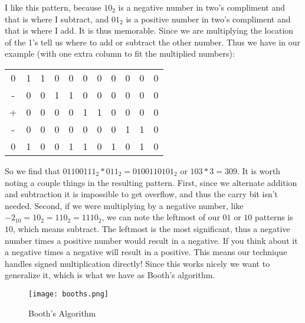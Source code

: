 I like this pattern, because $10_2$ is a negative number in two's compliment and that is where I subtract, and $01_2$ is a positive number in two's compliment and that is where I add.  It is thus memorable.  Since we are multiplying the location of the 1's tell us where to add or subtract the other number.  Thus we have in our example (with one extra column to fit the multiplied numbers):

\begin{tabular}{cccccccccc@{ . }c}
0 & {\color{blue}1}
      & {\color{blue}1}
          & 0 & 0 & 0 & 0 & 0 & 0 & 0 & 0\\
- & 0 & 0 & {\color{red}1}
              & {\color{red}1}
                  & 0 & 0 & 0 & 0 & 0 & 0\\
+ & 0 & 0 & 0 & 0 & {\color{blue}1}
                      & {\color{blue}1}
                          & 0 & 0 & 0 & 0\\
- & 0 & 0 & 0 & 0 & 0 & 0 & 0 & {\color{red}1}
                                  & {\color{red}1}
                                      & 0\\\hline
0 & 1 & 0 & 0 & 1 & 1 & 0 & 1 & 0 & 1 & 0\\
\end{tabular}

So we find that $01100111_2 * 011_2=0100110101_2$ or $103*3=309$.  It is worth noting a couple things in the resulting pattern. First, since we alternate addition and subtraction it is impossible to get overflow, and thus the carry bit isn't needed.  Second, if we were multiplying by a negative number, like $-2_{10}=10_2=110_2=1110_2$, we can note the leftmost of our $01$ or $10$ patterns is $10$, which means subtract.  The leftmost is the most significant, thus a negative number times a positive number would result in a negative.  If you think about it a negative times a negative will result in a positive.  This means our technique handles signed multiplication directly! Since this works nicely we want to generalize it, which is what we have as Booth's algorithm.

\begin{wrapfigure}{l}{2in}
\caption{Booth's Algorithm}\label{f-booths}
\begin{center}
\texttt{[image: booths.png]}
\end{center}
\end{wrapfigure}

